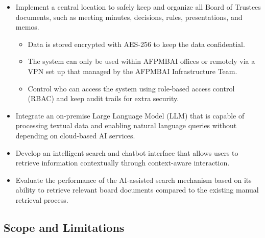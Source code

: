                 \begin{itemize}
                \item Implement a central location to safely keep and organize all Board of Trustees documents, such as meeting minutes, decisions, rules, presentations, and memos.
                \begin{itemize}
                    \item  Data is stored encrypted with AES-256 to keep the data confidential.
                    \item The system can only be used within AFPMBAI offices or remotely via a VPN set up that managed by the AFPMBAI Infrastructure Team.
                    \item Control who can access the system using role-based access control (RBAC) and keep audit trails for extra security.
                \end{itemize}
                \item Integrate an on-premise Large Language Model (LLM) that is capable of processing textual data and enabling natural language queries without depending on cloud-based AI services.
                \item Develop an intelligent search and chatbot interface that allows users to retrieve information contextually through context-aware interaction.
                 \item Evaluate the performance of the AI-assisted search mechanism based on its ability to retrieve relevant board documents compared to the existing manual retrieval process.

\end{itemize}

    \subsection{Scope and Limitations}
